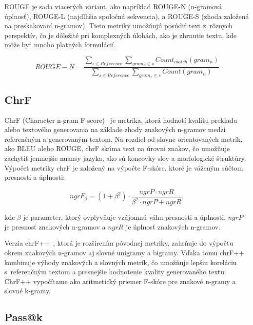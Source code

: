 ROUGE je sada viacerých variant, ako napríklad ROUGE-N (n-gramová úplnosť), ROUGE-L (najdlhšia spoločná sekvencia), a ROUGE-S (zhoda založená na preskakovaní n-gramov). Tieto metriky umožňujú posúdiť text z~rôznych perspektív, čo je dôležité pri komplexných úlohách, ako je zhrnutie textu, kde môže byť mnoho platných formulácií.

\begin{equation}\label{eq:rouge}
ROUGE-N = \frac{\sum_{s \in {Reference}} \sum_{gram_n \in s} Count_{match}(gram_n)}{\sum_{s \in {Reference}} \sum_{gram_n \in s} Count(gram_n)}
\end{equation}

\subsection{ChrF}
ChrF (Character n-gram F-score)~\cite{popovic2015chrf} je metrika, ktorá hodnotí kvalitu prekladu alebo textového generovania na základe zhody znakových n-gramov medzi referenčným a generovaným textom. Na rozdiel od slovne orientovaných metrík, ako BLEU alebo ROUGE, chrF skúma text na úrovni znakov, čo umožňuje zachytiť jemnejšie nuansy jazyka, ako sú koncovky slov a morfologické štruktúry. Výpočet metriky chrF je založený na výpočte F-skóre, ktoré je váženým súčtom presnosti a úplnosti:

\begin{equation}\label{eq:chrf}
    ngrF_{\beta} = (1 + \beta^2) \cdot \frac{ngrP \cdot ngrR}{\beta^2 \cdot ngrP + ngrR},
\end{equation}

\noindent kde  $\beta$ je parameter, ktorý ovplyvňuje vzájomnú váhu presnosti a úplnosti, $ngrP$ je presnosť znakových n-gramov a $ngrR$ je úplnosť znakových n-gramov.

Verzia chrF{++}~\cite{popovic2017chrf}, ktorá je rozšírením pôvodnej metriky, zahrňuje do výpočtu okrem znakových n-gramov aj slovné unigramy a bigramy. Vďaka tomu chrF++ kombinuje výhody znakových a slovných metrík, čo umožňuje lepšiu koreláciu s~referenčným textom a presnejšie hodnotenie kvality generovaného textu. ChrF{++} vypočítame ako aritmetický priemer F-skóre pre znakové n-gramy a slovné k-gramy.

\subsection{Pass@k}


